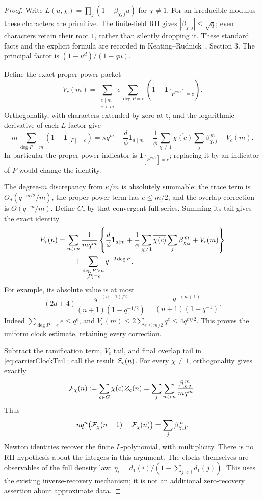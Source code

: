 \documentclass[11pt]{article}
\begin{document}
\begin{proof}
Write
\(L(u,\chi)=\prod_j(1-\beta_{\chi,j}u)\) for \(\chi\ne1\).
For an irreducible modulus these characters are primitive.
The finite-field RH gives \(|\beta_{\chi,j}|\leq\sqrt q\);
even characters retain their root \(1\), rather than silently dropping
it. These standard facts and the explicit formula are recorded in
Keating--Rudnick~\cite{KeatingRudnick}, Section 3.
The principal factor is \((1-u^d)/(1-qu)\).

Define the exact proper-power packet
\[
 V_c(m)=\sum_{\substack{e\mid m\\e<m}}e
       \sum_{\deg P=e}\left(1+
             \mathbf1_{[P^{m/e}]=c}\right).
\]
Orthogonality, with characters extended by zero at \(\mathfrak r\),
and the logarithmic derivative of each \(L\)-factor give
\begin{equation}\label{eq:carrierTrace}
 m\sum_{\deg P=m}(1+\mathbf1_{[P]=c})
 =\kappa q^m-\frac d\phi\mathbf1_{d\mid m}
 -\frac1\phi\sum_{\chi\ne1}\overline{\chi(c)}
           \sum_j\beta_{\chi,j}^{\,m}-V_c(m).
\end{equation}
In particular the proper-power indicator is
\(\mathbf1_{[P^{m/e}]=c}\); replacing it by an indicator of \(P\)
would change the identity.

The degree-\(m\) discrepancy from \(\kappa/m\) is absolutely summable:
the trace term is \(O_d(q^{-m/2}/m)\), the proper-power term has
\(e\leq m/2\), and the overlap correction is \(O(q^{-m}/m)\).
Define \(C_c\) by that convergent full series. Summing its tail gives
the exact identity
\begin{align}
 E_c(n)&=\sum_{m>n}\frac1{m q^m}
 \left\{\frac d\phi\mathbf1_{d\mid m}
 +\frac1\phi\sum_{\chi\ne1}\overline{\chi(c)}
                   \sum_j\beta_{\chi,j}^{\,m}
 +V_c(m)\right\}\nonumber\\
 &\hspace{8mm}+
 \sum_{\substack{\deg P>n\\{[P]=c}}}q^{-2\deg P}.
 \label{eq:carrierClockTail}
\end{align}
For example, its absolute value is at most
\[
 (2d+4)\frac{q^{-(n+1)/2}}{(n+1)(1-q^{-1/2})}
 +\frac{q^{-(n+1)}}{(n+1)(1-q^{-1})}.
\]
Indeed \(\sum_{\deg P=e}e\leq q^e\), and
\(V_c(m)\leq2\sum_{e\leq m/2}q^e\leq4q^{m/2}\).
This proves the uniform clock estimate, retaining every correction.

Subtract the ramification term, \(V_c\) tail, and final overlap tail
in \eqref{eq:carrierClockTail}; call the result \({\cal Z}_c(n)\).
For every \(\chi\ne1\), orthogonality gives exactly
\[
 {\cal F}_\chi(n):=\sum_{c\in G}\chi(c){\cal Z}_c(n)
       =\sum_j\sum_{m>n}\frac{\beta_{\chi,j}^{\,m}}{m q^m}.
\]
Thus
\[
 nq^n\bigl({\cal F}_\chi(n-1)-{\cal F}_\chi(n)\bigr)
       =\sum_j\beta_{\chi,j}^{\,n}.
\]
Newton identities recover the finite \(L\)-polynomial, with multiplicity.
There is no RH hypothesis about the integers in this argument.
The clocks themselves are observables of the full density law:
\(\eta_i=d_1(i)/(1-\sum_{j<i}d_1(j))\).
This uses the existing inverse-recovery mechanism; it is not an
additional zero-recovery assertion about approximate data.


\end{proof}
\end{document}
